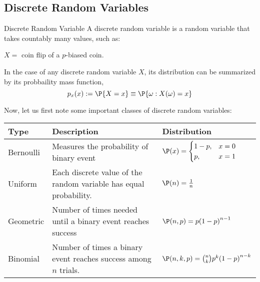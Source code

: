 \subsection{Discrete Random Variables}
\begin{ln-define}{Discrete Random Variable}{}
    A discrete random variable is a random variable that takes countably many values, such as:
    \begin{bindenum}
        \item $X =$ coin flip of a $p$-biased coin.
    \end{bindenum}
\end{ln-define}
In the case of any discrete random variable $X$, its distribution can be summarized by its probbaility mass function, 
\[p_x(x) := \P\{X = x\} \equiv \P\{\omega : X(\omega) = x\}\]

Now, let us first note some important classes of discrete random variables:
\begin{center}
    \begin{tabular}{l||l|l}
        Type & Description & Distribution \\
        \hline
        Bernoulli & Measures the probability of binary event & 
        $
            \P (x) =
            \begin{cases}
                1 - p, &
                x = 0 \\
                p, &x = 1
            \end{cases}
        $ \\
        Uniform & Each discrete value of the random variable has equal probability. & 
        $
            \P (n) = \frac{1}{n}
        $ \\
        Geometric & Number of times needed until a binary event reaches success & 
        $
            \P (n, p) = p {(1 - p)}^{n - 1}
        $ \\
        Binomial & Number of times a binary event reaches success among $n$ trials.& 
        $ 
            \P (n, k, p) = \binom{n}{k} p^k {(1 - p)}^{n - k}
        $
    \end{tabular}
\end{center}

